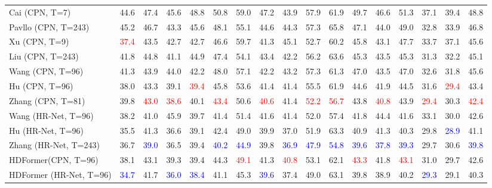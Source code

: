 \documentclass{article}
\begin{document}
\begin{table*}
{\begin{tabular}{l|c|c|c|c|c|c|c|c|c|c|c|c|c|c|c|c}
    Cai \cite{cai2019-exploiting} (CPN, T=7)  & 44.6 & 47.4 & 45.6 & 48.8 & 50.8 & 59.0 & 47.2 & 43.9 & 57.9 & 61.9 & 49.7 & 46.6 & 51.3 & 37.1 & 39.4 & 48.8 \\ 
    Pavllo \cite{pavllo2019-3d} (CPN, T=243)  & 45.2 & 46.7 & 43.3 & 45.6 & 48.1 & 55.1 & 44.6 & 44.3 & 57.3 & 65.8 & 47.1 & 44.0 & 49.0 & 32.8 & 33.9 & 46.8 \\ 
    Xu \cite{xu2020-deep} (CPN, T=9)  & \textcolor{red}{37.4} & 43.5 & 42.7 & 42.7 & 46.6 & 59.7 & 41.3 & 45.1 & 52.7 & 60.2 & 45.8 & 43.1 & 47.7 & 33.7 & 37.1 & 45.6 \\ 
    Liu \cite{liu2020-attention}(CPN, T=243)  & 41.8 & 44.8 & 41.1 & 44.9 & 47.4 & 54.1 & 43.4 & 42.2 & 56.2 & 63.6 & 45.3 & 43.5 & 45.3 & 31.3 & 32.2 & 45.1 \\ 
    Wang \cite{wang2020-motion} (CPN, T=96)   & 41.3 & 43.9 & 44.0 & 42.2 & 48.0 & 57.1 & 42.2 & 43.2 & 57.3 & 61.3 & 47.0 & 43.5 & 47.0 & 32.6 & 31.8 & 45.6 \\ 
    Hu \cite{hu(2021)-conditional} (CPN, T=96)  & 38.0 & 43.3 & 39.1 & \textcolor{red}{39.4} & 45.8 & 53.6 & 41.4 & 41.4 & 55.5 & 61.9 & 44.6 & 41.9 & 44.5 & 31.6 & \textcolor{red}{29.4} & 43.4 \\ 
    Zhang \cite{ZhangCVPR22MixSTE} (CPN, T=81)  & 39.8 & \textcolor{red}{43.0} & \textcolor{red}{38.6} & 40.1 & \textcolor{red}{43.4} & 50.6 & \textcolor{red}{40.6} & 41.4 & \textcolor{red}{52.2} & \textcolor{red}{56.7} & 43.8 & \textcolor{red}{40.8} & 43.9 & \textcolor{red}{29.4} & 30.3 & \textcolor{red}{42.4} \\ 
    Wang \cite{wang2020-motion} (HR-Net, T=96)   & 38.2 & 41.0 & 45.9 & 39.7 & 41.4 & 51.4 & 41.6 & 41.4 & 52.0 & 57.4 & 41.8 & 44.4 & 41.6 & 33.1 & 30.0 & 42.6 \\ 
    Hu \cite{hu(2021)-conditional} (HR-Net, T=96)  & 35.5 & 41.3 & 36.6 & 39.1 & 42.4 & 49.0 & 39.9 & 37.0 & 51.9 & 63.3 & 40.9 & 41.3 & 40.3 & 29.8 & \textcolor{blue}{28.9} & 41.1 \\ 
    Zhang \cite{ZhangCVPR22MixSTE} (HR-Net, T=243)  & 36.7 & \textcolor{blue}{39.0} & 36.5 & 39.4 & \textcolor{blue}{40.2} & \textcolor{blue}{44.9} & 39.8 & \textcolor{blue}{36.9} & \textcolor{blue}{47.9} & \textcolor{blue}{54.8} & \textcolor{blue}{39.6} & \textcolor{blue}{37.8} & \textcolor{blue}{39.3} & 29.7 & 30.6 & \textcolor{blue}{39.8} \\ 
    \hline
    HDFormer(CPN, T=96)  & 38.1 & 43.1 & 39.3 & 39.4 & 44.3 & \textcolor{red}{49.1} & 41.3 & \textcolor{red}{40.8} & 53.1 & 62.1 & \textcolor{red}{43.3} & 41.8 & \textcolor{red}{43.1} & 31.0 & 29.7 & 42.6 \\ 
    HDFormer (HR-Net, T=96)  & \textcolor{blue}{34.7} & 41.7 & \textcolor{blue}{36.0} & \textcolor{blue}{38.4} & 41.1 & 45.3 & \textcolor{blue}{39.6} & 37.4 & 49.0 & 63.1 & 39.8 & 38.9 & 40.2 & \textcolor{blue}{29.3} & 29.1 & 40.3 \\ 


\end{tabular}}
\end{table*}
\end{document}
